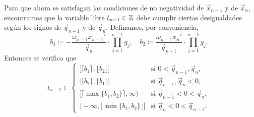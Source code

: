 Para que ahora se satisfagan las condiciones de no negatividad de $\vec{x}_{n-1}$ y de $\vec{x}_n$,
encontramos que la variable libre $t_{n-1} \in \mathbb{Z}$ debe cumplir ciertas desigualdades según los
signos de $\vec{q}_{n-1}$ y de $\vec{q}_n$. Definamos, por conveniencia,
\begin{equation}
	\label{eq:lr-bounds}
	b_1 \coloneq -\frac{\omega_{n-1}x_{n-1}'}{\vec{q}_n} \cdot \prod_{j=1}^{n-1}g_j,
	\quad b_2 \coloneq \frac{\omega_{n-1}x_{n}'}{\vec{q}_{n-1}} \cdot \prod_{j=1}^{n-1}g_j.
\end{equation}
Entonces se verifica que
\begin{equation}
	\label{eq:feasible-param}
	t_{n-1} \in 
	\begin{cases}
		\big[ \lceil b_1 \rceil, \lfloor b_2 \rfloor \big] & \text{si } 0 < \vec{q}_{n-1}, \vec{q}_n, \\
		\big[ \lceil b_2 \rceil, \lfloor b_1 \rfloor \big] & \text{si } \vec{q}_{n-1}, \vec{q}_n < 0, \\
		\big[ \lceil \max\lbrace b_1 ,  b_2 \rbrace \rceil, \infty \big) & \text{si } \vec{q}_{n-1}
		< 0 < \vec{q}_n, \\
		\big( -\infty, \lfloor \min\lbrace b_1, b_2\rbrace \rfloor \big] & \text{si } \vec{q}_n < 0
		< \vec{q}_{n-1}.
	\end{cases}
\end{equation}

